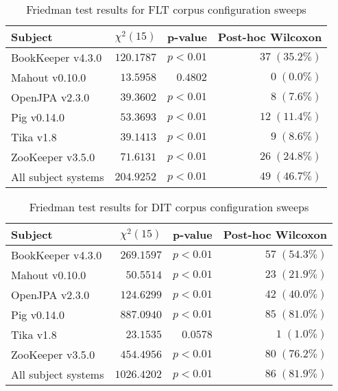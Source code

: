 \begin{table}
\begin{spacing}{1.2}
\centering
\caption{Friedman test results for FLT corpus configuration sweeps}
\label{table:combo-friedman-flt}
\begin{tabular}{lrrr}
\toprule
                      Subject & $\chi^2(15)$ &  p-value & Post-hoc Wilcoxon \\
\midrule
            BookKeeper v4.3.0 &   $120.1787$ & $p<0.01$ &    $37\;(35.2\%)$ \\
               Mahout v0.10.0 &    $13.5958$ & $0.4802$ &      $0\;(0.0\%)$ \\
               OpenJPA v2.3.0 &    $39.3602$ & $p<0.01$ &      $8\;(7.6\%)$ \\
                  Pig v0.14.0 &    $53.3693$ & $p<0.01$ &    $12\;(11.4\%)$ \\
                    Tika v1.8 &    $39.1413$ & $p<0.01$ &      $9\;(8.6\%)$ \\
             ZooKeeper v3.5.0 &    $71.6131$ & $p<0.01$ &    $26\;(24.8\%)$ \\
 \midrule
All subject systems &   $204.9252$ & $p<0.01$ &    $49\;(46.7\%)$ \\
\bottomrule
\end{tabular}

\end{spacing}
\end{table}

\begin{table}
\begin{spacing}{1.2}
\centering
\caption{Friedman test results for DIT corpus configuration sweeps}
\label{table:combo-friedman-dit}
\begin{tabular}{lrrr}
\toprule
                      Subject & $\chi^2(15)$ &  p-value & Post-hoc Wilcoxon \\
\midrule
            BookKeeper v4.3.0 &   $269.1597$ & $p<0.01$ &    $57\;(54.3\%)$ \\
               Mahout v0.10.0 &    $50.5514$ & $p<0.01$ &    $23\;(21.9\%)$ \\
               OpenJPA v2.3.0 &   $124.6299$ & $p<0.01$ &    $42\;(40.0\%)$ \\
                  Pig v0.14.0 &   $887.0940$ & $p<0.01$ &    $85\;(81.0\%)$ \\
                    Tika v1.8 &    $23.1535$ & $0.0578$ &      $1\;(1.0\%)$ \\
             ZooKeeper v3.5.0 &   $454.4956$ & $p<0.01$ &    $80\;(76.2\%)$ \\
 \midrule
All subject systems &  $1026.4202$ & $p<0.01$ &    $86\;(81.9\%)$ \\
\bottomrule
\end{tabular}

\end{spacing}
\end{table}

